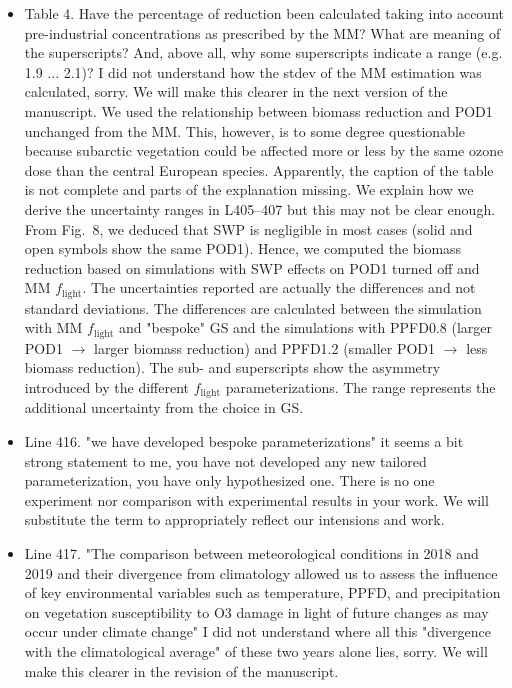 \documentclass{scrartcl}
\begin{document}
\begin{itemize}
\item {\color{blue}Table 4.  Have the percentage of reduction been calculated taking into account pre-industrial concentrations as prescribed by the MM?
What are meaning of the superscripts? And, above all, why some superscripts indicate a range (e.g. 1.9 ... 2.1)? I did not understand how the stdev of the MM estimation was calculated, sorry.}
We will make this clearer in the next version of the manuscript. We used the relationship between biomass reduction and POD1 unchanged from the MM. This, however, is to some degree questionable because subarctic vegetation could be affected more or less by the same ozone dose than the central European species. Apparently, the caption of the table is not complete and parts of the explanation missing. We explain how we derive the uncertainty ranges in L405--407 but this may not be clear enough. From Fig.~8, we deduced that SWP is negligible in most cases (solid and open symbols show the same POD1). Hence, we computed the biomass reduction based on simulations with SWP effects on POD1 turned off and MM $f_\mathrm{light}$. The uncertainties reported are actually the differences and not standard deviations. The differences are calculated between the simulation with MM $f_\mathrm{light}$ and "bespoke" GS and the simulations with PPFD0.8 (larger POD1 $\rightarrow$ larger biomass reduction) and PPFD1.2 (smaller POD1 $\rightarrow$ less biomass reduction). The sub- and superscripts show the asymmetry introduced by the different $f_\mathrm{light}$ parameterizations. The range represents the additional uncertainty from the choice in GS.

\item {\color{blue}Line 416. "we have developed bespoke parameterizations"
it seems a bit strong statement to me, you have not developed any new tailored
parameterization, you have only hypothesized one. There is no one experiment nor
comparison with experimental results in your work.}
We will substitute the term to appropriately reflect our intensions and work.

\item {\color{blue}Line 417. "The comparison between meteorological conditions in 2018 and 2019 and their divergence from climatology allowed us to assess the influence of key environmental variables such as temperature, PPFD, and precipitation on vegetation susceptibility to O3 damage in light of future changes as may occur under climate change" I did not understand where all this "divergence with the climatological average" of these two years alone lies, sorry.}
We will make this clearer in the revision of the manuscript.


\end{itemize}
\end{document}
